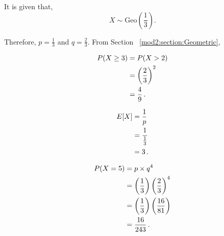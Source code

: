 \begin{subquestions}
\begin{subsubquestions}
\end{subsubquestions}


\subquestion

It is given that,
\begin{equation}
	X \sim \text{Geo}(\frac{1}{3}).
\end{equation}

Therefore, $p=\frac{1}{3}$ and $q=\frac{2}{3}$. From Section ~\ref{mod2:section:Geometric},

\begin{subsubquestions}

\subsubquestion

\begin{align}
	P(X \geq 3) & = P(X > 2) \nonumber \\
	            & = \left(\frac{2}{3} \right)^2 \nonumber \\
	            & = \frac{4}{9} \,.
\end{align}


\subsubquestion

\begin{align}
	E[X] & = \frac{1}{p} \nonumber \\
	     & = \frac{1}{\frac{1}{3}} \nonumber \\
	     & = 3 \,.
\end{align}


\subsubquestion

\begin{align}
	P(X=5) & = p \times q^4 \nonumber \\
	       & = \left(\frac{1}{3} \right) \left(\frac{2}{3} \right)^4 \nonumber \\
	       & = \left(\frac{1}{3} \right) \left(\frac{16}{81} \right) \nonumber \\
           & = \frac{16}{243} \,. 
\end{align}

\end{subsubquestions}



\end{subquestions}
